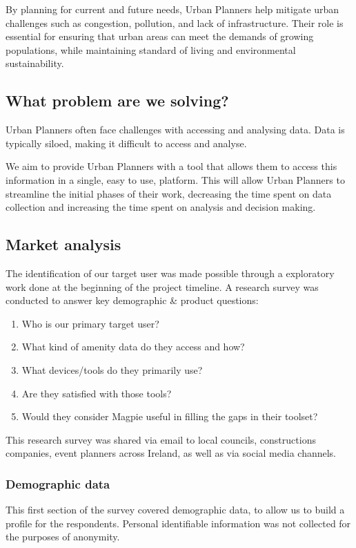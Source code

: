 \documentclass[preview]{standalone}
\begin{document}
By planning for current and future needs, Urban Planners help mitigate urban
challenges such as congestion, pollution, and lack of infrastructure. Their role
is essential for ensuring that urban areas can meet the demands of growing
populations, while maintaining standard of living and environmental
sustainability.

\subsection{What problem are we solving?}
Urban Planners often face challenges with accessing and analysing data. Data is
typically siloed, making it difficult to access and analyse.

We aim to provide Urban Planners with a tool that allows them to access this
information in a single, easy to use, platform. This will allow Urban Planners
to streamline the initial phases of their work, decreasing the time spent on
data collection and increasing the time spent on analysis and decision making.

\subsection{Market analysis}
The identification of our target user was made possible through a exploratory work done at the beginning of the project timeline.
A research survey was conducted to answer key demographic \& product questions:
\begin{enumerate}
    \item{Who is our primary target user?}
    \item{What kind of amenity data do they access and how?}
    \item{What devices/tools do they primarily use?}
    \item{Are they satisfied with those tools?}
    \item{Would they consider Magpie useful in filling the gaps in their toolset?}
\end{enumerate}
This research survey was shared via email to local councils, constructions companies, event planners across Ireland, as well as via social media channels.

\newpage{}

\subsubsection{Demographic data}
This first section of the survey covered demographic data, to allow us to build a profile for the respondents. Personal identifiable information was not collected for the purposes of anonymity.
\end{document}
